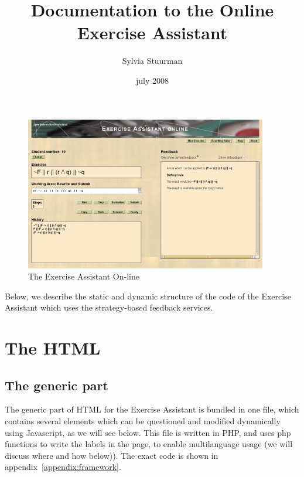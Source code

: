 \documentclass{article}
\begin{document}
\newcommand{\todo}[1]{\vspace{0.5cm} \large \textbf{\underline{TODO}}\\ \normalsize #1 \vspace{0.5cm}}
\title{Documentation to the Online Exercise Assistant}
\author{Sylvia Stuurman}
\date{july 2008}
\maketitle
\begin{figure}[h]
\begin{center}
\includegraphics{figures/page-elements.png}
\end{center}
\caption{The Exercise Assistant On-line}\label{figure:screenshot}
\end{figure}
Below, we describe the static and dynamic structure of the code of the Exercise Assistant which uses the strategy-based feedback services.

\section{The HTML}
\subsection{The generic part}
The generic part of HTML for the Exercise Assistant is bundled in one file, which contains several elements which can be questioned and modified dynamically using Javascript, as we will see below. This file is written in PHP, and uses
php functions to write the labels in the page, to enable multilanguage usage (we will discuss where and how below)). The exact code is shown in appendix~\ref{appendix:framework}. 
\end{document}

